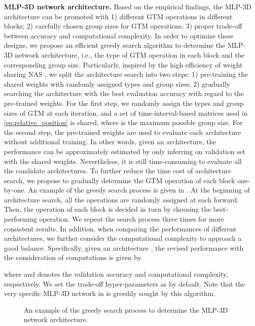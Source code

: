 \documentclass[10pt,twocolumn,letterpaper]{article}
\begin{document}
\textbf{MLP-3D network architecture.} Based on the empirical findings, the MLP-3D architecture can be promoted with 1) different GTM operations in different blocks; 2) carefully chosen group sizes for GTM operations; 3) proper trade-off between accuracy and computational complexity. In order to optimize these designs, we propose an efficient greedy search algorithm to determine the MLP-3D network architecture, i.e., the type of GTM operation in each block and the corresponding group size. Particularly, inspired by the high efficiency of weight sharing NAS \cite{cai2018efficient, pham2018efficient, luo2018neural}, we split the architecture search into two steps: 1) pre-training the shared weights with randomly assigned types and group sizes; 2) gradually searching the architecture with the best evaluation accuracy with regard to the pre-trained weights. For the first step, we randomly assign the types and group sizes of GTM at each iteration, and a set of time-interval-based matrices  used in \cref{eq:relative_position} is shared, where  is the maximum possible group size. For the second step, the pre-trained weights are used to evaluate each architecture without additional training. In other words, given an architecture, the performance can be approximately estimated by only inferring on validation set with the shared weights. Nevertheless, it is still time-consuming to evaluate all the candidate architectures. To further reduce the time cost of architecture search, we propose to gradually determine the GTM operation of each block one-by-one. An example of the greedy search process is given in . At the beginning of architecture search, all the operations are randomly assigned at each forward. Then, the operation of each block is decided in turn by choosing the best-performing operation. We repeat the search process three times for more consistent results. In addition, when comparing the performances of different architectures, we further consider the computational complexity to approach a good balance. Specifically, given an architecture , the revised performance with the consideration of computations is given by

where  and  denotes the validation accuracy and computational complexity, respectively. We set the trade-off hyper-parameters  as  by default. Note that the very specific MLP-3D network in  is greedily sought by this algorithm.

\begin{figure}[!tb]
   \vspace{-0.1in}
   \caption{\small An example of the greedy search process to determine the MLP-3D network architecture.}
   \label{fig:search}
   \vspace{-0.2in}
\end{figure}
\end{document}
